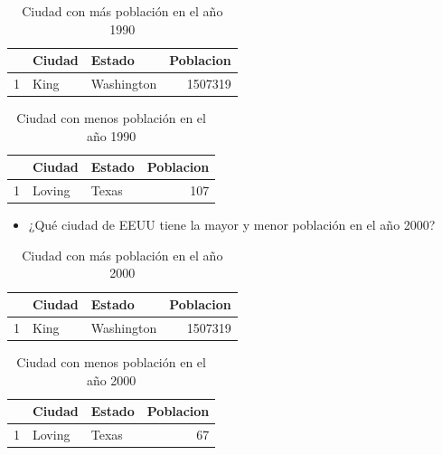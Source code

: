\documentclass[conference]{IEEEtran}\usepackage[]{graphicx}\usepackage[]{color}
\begin{document}
\begin{table}[ht]
\centering
\begin{tabular}{rllr}
  \hline
 & Ciudad & Estado & Poblacion \\ 
  \hline
1 & King & Washington & 1507319 \\ 
   \hline
\end{tabular}
\caption{Ciudad con más población en el año 1990} 
\end{table}


\begin{table}[ht]
\centering
\begin{tabular}{rllr}
  \hline
 & Ciudad & Estado & Poblacion \\ 
  \hline
1 & Loving & Texas & 107 \\ 
   \hline
\end{tabular}
\caption{Ciudad con menos población en el año 1990} 
\end{table}


\begin{itemize}
\item ¿Qué ciudad de EEUU tiene la mayor y menor población en el año 2000?
\end{itemize}

\begin{table}[ht]
\centering
\begin{tabular}{rllr}
  \hline
 & Ciudad & Estado & Poblacion \\ 
  \hline
1 & King & Washington & 1507319 \\ 
   \hline
\end{tabular}
\caption{Ciudad con más población en el año 2000} 
\end{table}


\begin{table}[ht]
\centering
\begin{tabular}{rllr}
  \hline
 & Ciudad & Estado & Poblacion \\ 
  \hline
1 & Loving & Texas &  67 \\ 
   \hline
\end{tabular}
\caption{Ciudad con menos población en el año 2000} 
\end{table}
\end{document}
